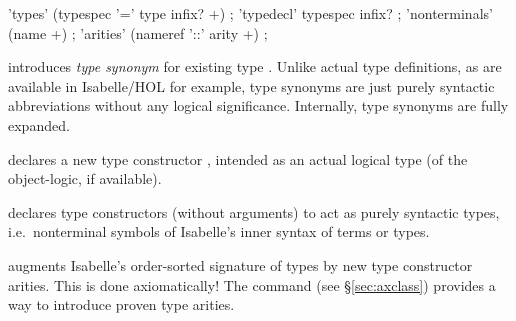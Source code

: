\begin{isabellebody}
\begin{isamarkuptext}
  \begin{rail}
    'types' (typespec '=' type infix? +)
    ;
    'typedecl' typespec infix?
    ;
    'nonterminals' (name +)
    ;
    'arities' (nameref '::' arity +)
    ;
  \end{rail}

  \begin{descr}

  \item [\mbox{\isa{\isacommand{types}}}~\isa{{\isacharparenleft}{\isasymalpha}\isactrlsub {\isadigit{1}}{\isacharcomma}\ {\isasymdots}{\isacharcomma}\ {\isasymalpha}\isactrlsub n{\isacharparenright}\ t\ {\isacharequal}\ {\isasymtau}}]
  introduces \emph{type synonym} 
  for existing type \isa{{\isasymtau}}.  Unlike actual type definitions, as
  are available in Isabelle/HOL for example, type synonyms are just
  purely syntactic abbreviations without any logical significance.
  Internally, type synonyms are fully expanded.
  
  \item [\mbox{\isa{\isacommand{typedecl}}}~\isa{{\isacharparenleft}{\isasymalpha}\isactrlsub {\isadigit{1}}{\isacharcomma}\ {\isasymdots}{\isacharcomma}\ {\isasymalpha}\isactrlsub n{\isacharparenright}\ t}]
  declares a new type constructor , intended as an actual
  logical type (of the object-logic, if available).

  \item [\mbox{\isa{\isacommand{nonterminals}}}~\isa{c}] declares type
  constructors  (without arguments) to act as purely
  syntactic types, i.e.\ nonterminal symbols of Isabelle's inner
  syntax of terms or types.

  \item [\mbox{\isa{\isacommand{arities}}}~\isa{t\ {\isacharcolon}{\isacharcolon}\ {\isacharparenleft}s\isactrlsub {\isadigit{1}}{\isacharcomma}\ {\isasymdots}{\isacharcomma}\ s\isactrlsub n{\isacharparenright}\ s}] augments Isabelle's order-sorted signature of types by new type
  constructor arities.  This is done axiomatically!  The \mbox{} command (see \S\ref{sec:axclass}) provides a way to
  introduce proven type arities.


\end{descr}
\end{isamarkuptext}
\end{isabellebody}
